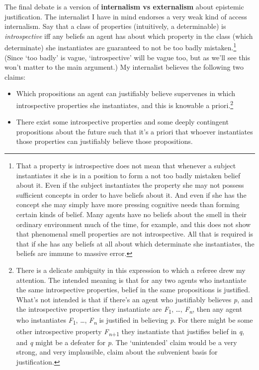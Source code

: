 The final debate is a version of \textbf{internalism vs externalism}
about epistemic justification. The internalist I have in mind endorses a
very weak kind of access internalism. Say that a class of properties
(intuitively, a determinable) is \emph{introspective} iff any beliefs an
agent has about which property in the class (which determinate) she
instantiates are guaranteed to not be too badly mistaken.\footnote{That
  a property is introspective does not mean that whenever a subject
  instantiates it she is in a position to form a not too badly mistaken
  belief about it. Even if the subject instantiates the property she may
  not possess sufficient concepts in order to have beliefs about it. And
  even if she has the concept she may simply have more pressing
  cognitive needs than forming certain kinds of belief. Many agents have
  no beliefs about the smell in their ordinary environment much of the
  time, for example, and this does not show that phenomenal smell
  properties are not introspective. All that is required is that if she
  has any beliefs at all about which determinate she instantiates, the
  beliefs are immune to massive error.} (Since `too badly' is vague,
`introspective' will be vague too, but as we'll see this won't matter to
the main argument.) My internalist believes the following two claims:

\begin{itemize}
\item
  Which propositions an agent can justifiably believe supervenes in
  which introspective properties she instantiates, and this is knowable
  a priori.\footnote{There is a delicate ambiguity in this expression to
    which a referee drew my attention. The intended meaning is that for
    any two agents who instantiate the same introspective properties,
    belief in the same propositions is justified. What's not intended is
    that if there's an agent who justifiably believes \emph{p}, and the
    introspective properties they instantiate are
    \emph{F}\textsubscript{1}, {\ldots{}}, \emph{F\textsubscript{n}},
    then any agent who instantiates \emph{F}\textsubscript{1},
    {\ldots{}}, \emph{F\textsubscript{n}} is justified in believing
    \emph{p}. For there might be some other introspective property
    \emph{F\textsubscript{n}}\textsubscript{+1} they instantiate that
    justifies belief in \emph{q}, and \emph{q} might be a defeater for
    \emph{p}. The `unintended' claim would be a very strong, and very
    implausible, claim about the subvenient basis for justification.}
\item
  There exist some introspective properties and some deeply contingent
  propositions about the future such that it's a priori that whoever
  instantiates those properties can justifiably believe those
  propositions.
\end{itemize}

